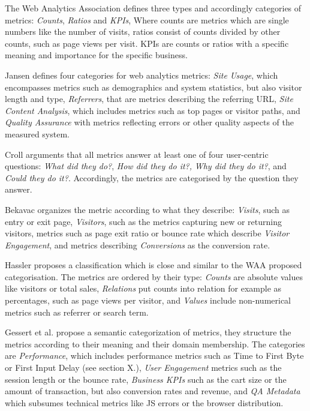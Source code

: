 The Web Analytics Association defines three types and accordingly categories of metrics: \textit{Counts}, \textit{Ratios} and \textit{KPIs},%
Where counts are metrics which are single numbers like the number of visits, ratios consist of counts divided by other counts, such as page views per visit.
KPIs are counts or ratios with a specific meaning and importance for the specific business.

Jansen defines four categories for web analytics metrics: %
\textit{Site Usage}, which encompasses metrics such as demographics and system statistics, but also visitor length and type,
\textit{Referrers}, that are metrics describing the referring URL,
\textit{Site Content Analysis}, which includes metrics such as top pages or visitor paths, and
\textit{Quality Assurance} with metrics reflecting errors or other quality aspects of the measured system.

	 
Croll arguments that all metrics answer at least one of four user-centric questions: \textit{What did they do?}, \textit{How did they do it?,} \textit{Why did they do it?}, and \textit{Could they do it?}. %
Accordingly, the metrics are categorised by the question they answer.

Bekavac organizes the metric according to what they describe: \textit{Visits}, such as entry or exit page,
\textit{Visitors}, such as the metrics capturing new or returning visitors,
metrics such as page exit ratio or bounce rate which describe \textit{Visitor Engagement},
and metrics describing \textit{Conversions} as the conversion rate. %


Hassler proposes a classification which is close and similar to the WAA proposed categorisation.
The metrics are ordered by their type: %
\textit{Counts} are absolute values like visitors or total sales,
\textit{Relations} put counts into relation for example as percentages, such as page views per visitor,
and \textit{Values} include non-numerical metrics such as referrer or search term.

Gessert et al.  propose a semantic categorization of metrics, they structure the metrics according to their meaning and their domain membership.
The categories are \textit{Performance}, which includes performance metrics such as Time to First Byte or First Input Delay (see section X.), \textit{User Engagement} metrics such as the session length or the bounce rate, \textit{Business KPIs} such as the cart size or the amount of transaction, but also conversion rates and revenue, and \textit{QA Metadata} which subsumes technical metrics like JS errors or the browser distribution.%

